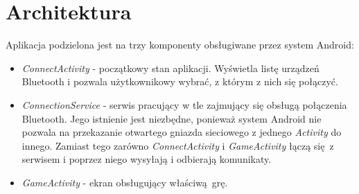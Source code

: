 \documentclass[paper=a4, fontsize=11pt]{scrartcl} %
\numberwithin{equation}{section} %
\numberwithin{figure}{section} %
\numberwithin{table}{section} %
\begin{document}
\section{Architektura}
Aplikacja podzielona jest na trzy komponenty obsługiwane przez system Android:

\begin{itemize}

  \item \emph{ConnectActivity} - początkowy stan aplikacji. Wyświetla listę
    urządzeń Bluetooth i pozwala użytkownikowy wybrać, z którym z nich się
    połączyć.

  \item \emph{ConnectionService} - serwis pracujący w tle zajmujący się obsługą
    połączenia Bluetooth. Jego istnienie jest niezbędne, ponieważ system
    Android nie pozwala na przekazanie otwartego gniazda sieciowego z jednego
    \textit{Activity} do innego. Zamiast tego zarówno \textit{ConnectActivity}
    i \textit{GameActivity} łączą się z serwisem i poprzez niego wysyłają i
    odbierają komunikaty.

  \item \emph{GameActivity} - ekran obsługujący właściwą grę.

\end{itemize}





\end{document}
